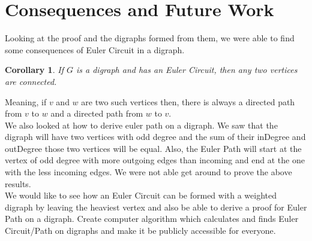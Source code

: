 \documentclass[17pt]{article}
\newtheorem{corollary}{Corollary}
\begin{document}
\section{Consequences and Future Work}
Looking at the proof and the digraphs formed from them, we were able to find some consequences of Euler Circuit in a digraph.

\begin{corollary} If $G$ is a digraph and has an Euler Circuit, then any two vertices are connected. 
\end{corollary}
Meaning, if $v$ and $w$ are two such vertices then, there is always a directed path from $v$ to $w$ and a directed path from $w$ to $v$.\\
We also looked at how to derive euler path on a digraph. We saw that the digraph will have two vertices with odd degree and the sum of their inDegree and outDegree those two vertices will be equal. Also, the Euler Path will start at the vertex of odd degree with more outgoing edges than incoming and end at the one with the less incoming edges. We were not able get around to prove the above results.\\
We would like to see how an Euler Circuit can be formed with a weighted digraph by leaving the heaviest vertex and also be able to derive a proof for Euler Path on a digraph. Create computer algorithm which calculates and finds Euler Circuit/Path on digraphs and make it be publicly accessible for everyone.
\end{document}
